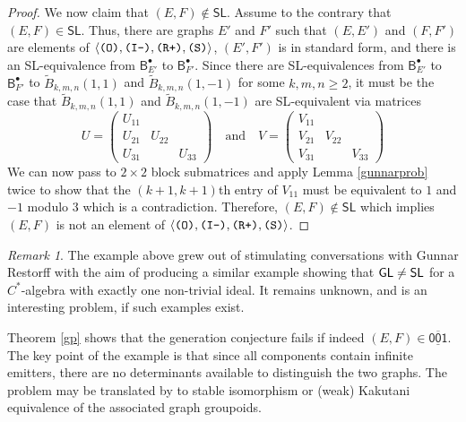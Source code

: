 \documentclass[12pt]{amsbook}%
\newenvironment{discu}{{\sc Discussion:}}{}
\theoremstyle{defin}
\theoremstyle{remark}
\newtheorem{remar}[theor]{Remark}
\newtheorem{openq}[theor]{Open question}
\numberwithin{equation}{chapter}
\numberwithin{theor}{section}
\newcommand{\xyzrel}[1]{\mbox{$\overline{\underline{\mathsf{ #1}}}$}}
\newcommand{\IIIm}{\mbox{\texttt{\textup{(I-)}}}}
\newcommand{\OOO}{\mbox{\texttt{\textup{(O)}}}}
\newcommand{\RRRp}{\mbox{\texttt{\textup{(R+)}}}}
\newcommand{\SSS}{\mbox{\texttt{\textup{(S)}}}}
\newcommand{\SL}{{\sf SL}}
\newcommand{\GL}{{\sf GL}}
\begin{document}
\begin{proof}
We now claim that $(E, F) \notin \mathsf{SL}$.  Assume to the contrary that $(E, F) \in \mathsf{SL}$.  Thus, there are graphs $E'$ and $F'$ such that $(E, E')$ and $(F,F')$ are elements of $\langle \OOO,\IIIm,\RRRp,\SSS\rangle$, $(E', F')$ is in standard form, and there is an \SL-equivalence from $\mathsf{B}^\bullet _{E'}$ to $\mathsf{B}^\bullet _{F'}$.  Since there are \SL-equivalences from $\mathsf{B}^\bullet _{E'}$ to $\mathsf{B}^\bullet _{F'}$ to $\widetilde{B}_{k,m,n}(1,1)$ and $\widetilde{B}_{k,m,n}(1,-1)$ for some $k, m ,n \geq 2$, it must be the case that $\widetilde{B}_{k,m,n}(1,1)$ and $\widetilde{B}_{k,m,n}(1,-1)$ are \SL-equivalent via matrices 
$$
U = 
\left( 
\begin{array}{c|c|c}
U_{11} & &  \\ \hline 
U_{21} & U_{22} &  \\ \hline
U_{31} &  & U_{33} 
\end{array}
\right)
\quad \text{and} \quad 
V = 
\left( 
\begin{array}{c|c|c}
V_{11} & &  \\ \hline 
V_{21} & V_{22} &  \\ \hline
V_{31} &  & V_{33}
\end{array}
\right)
$$
We can now pass to $2\times 2$ block submatrices and apply Lemma \ref{gunnarprob} twice to show that the $(k+1,k+1)$th entry of $V_{11}$ must be equivalent to $1$ and $-1$ modulo $3$ which is a contradiction.  Therefore, $(E, F) \notin \mathsf{SL}$ which implies $(E, F)$ is not an element of $\langle \OOO,\IIIm,\RRRp,\SSS\rangle$.
\end{proof}

\begin{remar}
The example above grew out of stimulating conversations with Gunnar Restorff with the aim of producing a similar example showing that $\GL\not=\SL$ for a $C^*$-algebra with exactly one non-trivial ideal. It remains unknown, and is an interesting problem, if such examples exist.
\end{remar} 

Theorem \ref{gp} shows that the generation conjecture fails if indeed $(E,F)\in \xyzrel{001}$. The key point of the example is that since all components contain infinite emitters, there are no determinants available to distinguish the two graphs. The problem may be translated by \cite[Corollary 3.6]{tmcerasmt:rgcds} to stable isomorphism or (weak) Kakutani equivalence of the associated graph groupoids.
\end{document}
